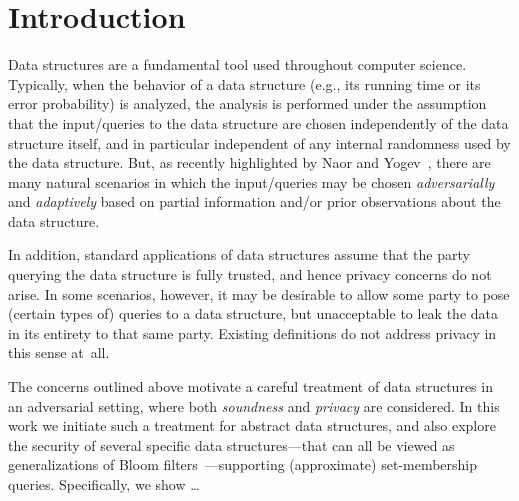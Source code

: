 \section{Introduction}
\label{sec:intro}

Data structures are a fundamental tool used throughout computer
science. Typically, when the behavior of a data structure (e.g., its
running time or its error probability) is analyzed, the analysis is
performed under the assumption that the input/queries to the data
structure are chosen independently of the data structure itself, and
in particular independent of any internal randomness used by the
data structure. But, as recently highlighted by Naor and
Yogev~\cite{naor2015bloom}, there are many natural scenarios in
which the input/queries may be chosen \emph{adversarially} and
\emph{adaptively} based on partial information and/or prior
observations about the data structure.

In addition, standard applications of data structures assume that
the party querying the data structure is fully trusted, and hence
privacy concerns do not arise. In some scenarios, however, it may be
desirable to allow some party to pose (certain types of) queries to
a data structure, but unacceptable to leak the data in its entirety
to that same party. Existing definitions do not address privacy in
this sense at~all.

The concerns outlined above motivate a careful treatment of data
structures in an adversarial setting, where both \emph{soundness}
 and \emph{privacy} are considered. In this work we initiate
such a treatment for abstract data structures, and also explore the
security of several specific data structures---that can all be
viewed as generalizations of Bloom
filters~\cite{bloom1970space}---supporting (approximate)
set-membership queries. Specifically, we show \ldots {}

